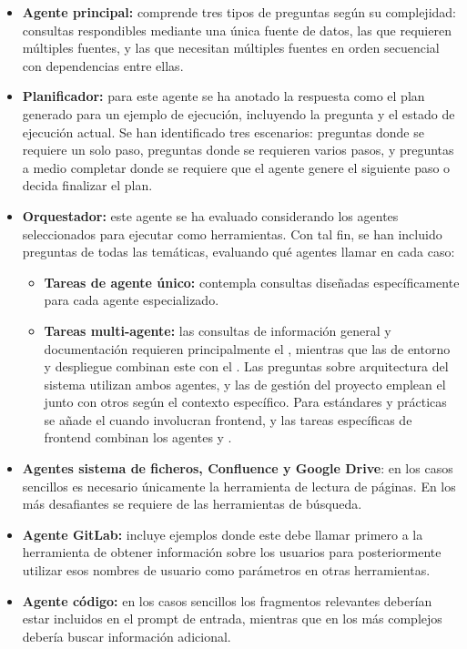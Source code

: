 \begin{itemize}
\item\textbf{Agente principal: }comprende tres tipos de preguntas según su complejidad: consultas respondibles mediante una única fuente de datos, las que requieren múltiples fuentes, y las que necesitan múltiples fuentes en orden secuencial con dependencias entre ellas.

\item\textbf{Planificador: }para este agente se ha anotado la respuesta como el plan generado para un ejemplo de ejecución, incluyendo la pregunta y el estado de ejecución actual. Se han identificado tres escenarios: preguntas donde se requiere un solo paso, preguntas donde se requieren varios pasos, y preguntas a medio completar donde se requiere que el agente genere el siguiente paso o decida finalizar el plan.

\item\textbf{Orquestador: }este agente se ha evaluado considerando los agentes seleccionados para ejecutar como herramientas. Con tal fin, se han incluido preguntas de todas las temáticas, evaluando qué agentes llamar en cada caso:

\begin{itemize}
\item \textbf{Tareas de agente único: }contempla consultas diseñadas específicamente para cada agente especializado.

\item \textbf{Tareas multi-agente:} las consultas de información general y documentación requieren principalmente el , mientras que las de entorno y despliegue combinan este con el . Las preguntas sobre arquitectura del sistema utilizan ambos agentes, y las de gestión del proyecto emplean el  junto con otros según el contexto específico. Para estándares y prácticas se añade el  cuando involucran frontend, y las tareas específicas de frontend combinan los agentes  y .

\end{itemize}
\item\textbf{Agentes sistema de ficheros, Confluence y Google Drive}: en los casos sencillos es necesario únicamente la herramienta de lectura de páginas. En los más desafiantes se requiere de las herramientas de búsqueda.
\item\textbf{Agente GitLab: }incluye ejemplos donde este debe llamar primero a la herramienta de obtener información sobre los usuarios para posteriormente utilizar esos nombres de usuario como parámetros en otras herramientas.
\item\textbf{Agente código: }en los casos sencillos los fragmentos relevantes deberían estar incluidos en el prompt de entrada, mientras que en los más complejos debería buscar información adicional.
\end{itemize}

